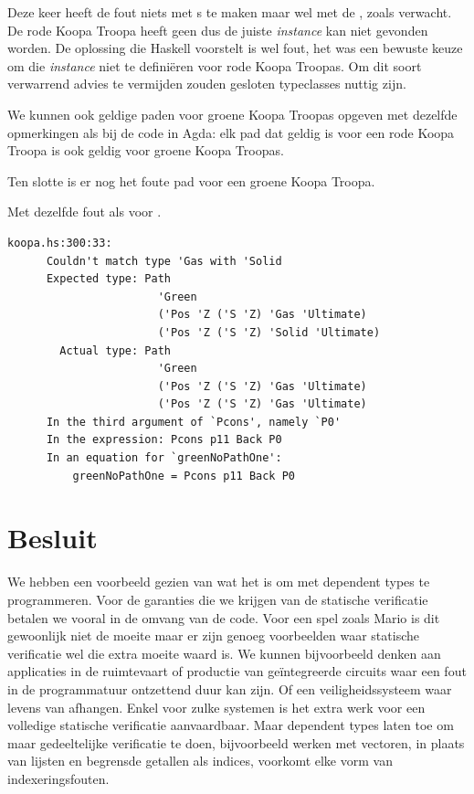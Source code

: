 Deze keer heeft de fout niets met s te maken maar wel met de
, zoals verwacht. De rode Koopa Troopa heeft geen
  dus de juiste \emph{instance} kan niet gevonden
worden. De oplossing die Haskell voorstelt is wel fout, het was een bewuste
keuze om die \emph{instance} niet te definiëren voor rode Koopa Troopas. Om dit
soort verwarrend advies te vermijden zouden gesloten typeclasses nuttig zijn.

We kunnen ook geldige paden voor groene Koopa Troopas opgeven met dezelfde
opmerkingen als bij de code in Agda: elk pad dat geldig is voor een rode Koopa
Troopa is ook geldig voor groene Koopa Troopas.


Ten slotte is er nog het foute pad voor een groene Koopa Troopa.


Met dezelfde fout als voor .

\begin{Verbatim}[fontsize=\small]
  koopa.hs:300:33:
      Couldn't match type 'Gas with 'Solid
      Expected type: Path
                       'Green
                       ('Pos 'Z ('S 'Z) 'Gas 'Ultimate)
                       ('Pos 'Z ('S 'Z) 'Solid 'Ultimate)
        Actual type: Path
                       'Green
                       ('Pos 'Z ('S 'Z) 'Gas 'Ultimate)
                       ('Pos 'Z ('S 'Z) 'Gas 'Ultimate)
      In the third argument of `Pcons', namely `P0'
      In the expression: Pcons p11 Back P0
      In an equation for `greenNoPathOne':
          greenNoPathOne = Pcons p11 Back P0
\end{Verbatim}


\section{Besluit}

We hebben een voorbeeld gezien van wat het is om met dependent types te
programmeren. Voor de garanties die we krijgen van de statische verificatie
betalen we vooral in de omvang van de code. Voor een spel zoals Mario is dit
gewoonlijk niet de moeite maar er zijn genoeg voorbeelden waar statische
verificatie wel die extra moeite waard is. We kunnen bijvoorbeeld  denken aan
applicaties in de ruimtevaart of productie van geïntegreerde circuits
waar een fout in de programmatuur ontzettend duur kan zijn. Of een
veiligheidssysteem waar levens van afhangen. Enkel voor zulke systemen is het
extra werk voor een volledige statische verificatie aanvaardbaar. Maar
dependent types laten toe om maar gedeeltelijke verificatie te doen,
bijvoorbeeld werken met vectoren, in plaats van lijsten en begrensde getallen
als indices, voorkomt elke vorm van indexeringsfouten.

